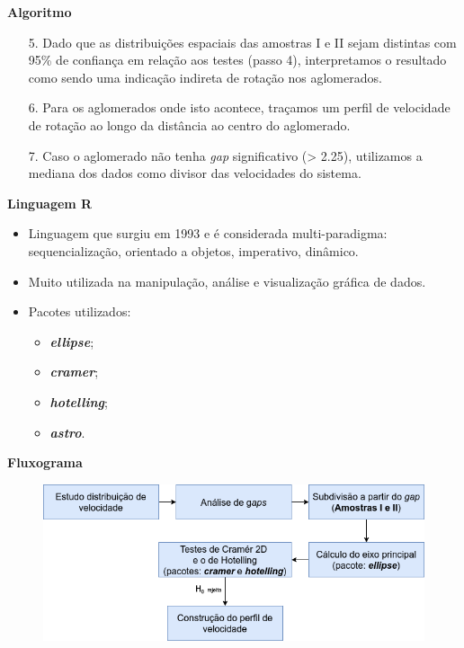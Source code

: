 \documentclass[xcolor=dvipsnames,10pt]{beamer}
\begin{document}
\begin{frame}{\textbf{Algoritmo}}
  \begin{enumerate}
    \item[5.] Dado que as distribuições espaciais das amostras I e II sejam distintas com 95\% de confiança em relação aos testes (passo 4), interpretamos o resultado como sendo uma indicação indireta de rotação nos aglomerados.
    \item[6.] Para os aglomerados onde isto acontece, traçamos um perfil de velocidade de rotação ao longo da distância ao centro do aglomerado.
    \item[7.] Caso o aglomerado não tenha \textit{gap} significativo (> 2.25), utilizamos a mediana dos dados como divisor das velocidades do sistema.
  \end{enumerate}
\end{frame}

\begin{frame}{\textbf{Linguagem R}}
	\begin{itemize}
		\item Linguagem que surgiu em 1993 e é considerada multi-paradigma: sequencialização, orientado a objetos, imperativo, dinâmico.
		\item Muito utilizada na manipulação, análise e visualização gráfica de dados.
		\item Pacotes utilizados:
		\begin{itemize}
			\item \textbf{\textit{ellipse}};
			\item \textbf{\textit{cramer}};
			\item \textbf{\textit{hotelling}};
			\item \textbf{\textit{astro}}.
		\end{itemize}
	\end{itemize}
\end{frame}

\begin{frame}{\textbf{Fluxograma}}
  \begin{figure}[!htbp]
    \centering
    \includegraphics[scale=.4]{resultados/fluxograma.png}
  \end{figure}
\end{frame}
\end{document}
